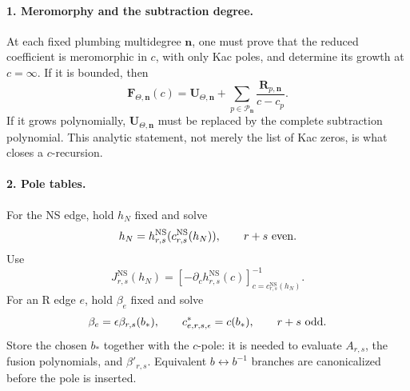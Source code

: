 \documentclass[11pt]{article}
\newcommand{\NS}{\mathrm{NS}}
\begin{document}
\paragraph{1. Meromorphy and the subtraction degree.}
At each fixed plumbing multidegree \(\boldsymbol n\), one must prove that the
reduced coefficient is meromorphic in \(c\), with only Kac poles, and
determine its growth at \(c=\infty\).  If it is bounded, then
\begin{equation}
 \mathbf F_{\Theta,\boldsymbol n}(c)
 =
 \mathbf U_{\Theta,\boldsymbol n}
 +
 \sum_{p\in\mathcal P_{\boldsymbol n}}
 \frac{\mathbf R_{p,\boldsymbol n}}{c-c_p}.
 \label{eq:nrr-partial-fraction}
\end{equation}
If it grows polynomially, \(\mathbf U_{\Theta,\boldsymbol n}\) must be
replaced by the complete subtraction polynomial.  This analytic statement,
not merely the list of Kac zeros, is what closes a \(c\)-recursion.

\paragraph{2. Pole tables.}
For the NS edge, hold \(h_N\) fixed and solve
\begin{equation}
 h_N=h^{\NS}_{r,s}(c^{\NS}_{r,s}(h_N)),
 \qquad r+s\ {\rm even}.
\end{equation}
Use
\begin{equation}
 J^{\NS}_{r,s}(h_N)
 =
 \left[-\partial_c h^{\NS}_{r,s}(c)\right]^{-1}
 _{c=c^{\NS}_{r,s}(h_N)}.
 \label{eq:nrr-ns-jacobian}
\end{equation}
For an R edge \(e\), hold \(\beta_e\) fixed and solve
\begin{equation}
 \beta_e=\epsilon\beta_{r,s}(b_*),
 \qquad
 c^*_{e,r,s,\epsilon}=c(b_*),
 \qquad r+s\ {\rm odd}.
 \label{eq:nrr-r-pole-table}
\end{equation}
Store the chosen \(b_*\) together with the \(c\)-pole: it is needed to
evaluate \(A_{r,s}\), the fusion polynomials, and \(\beta'_{r,s}\).
Equivalent \(b\leftrightarrow b^{-1}\) branches are canonicalized before
the pole is inserted.
\end{document}
